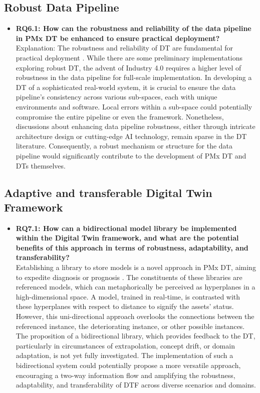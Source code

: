 \documentclass[runningheads]{llncs}
\begin{document}
\subsection{Robust Data Pipeline}

\begin{itemize}
    \item \textbf{RQ6.1: How can the robustness and reliability of the data pipeline in PMx DT be enhanced to ensure practical deployment?} \\
    Explanation: The robustness and reliability of DT are fundamental for practical deployment \cite{preuveneers2018robust}. While there are some preliminary implementations exploring robust DT, the advent of Industry 4.0 requires a higher level of robustness in the data pipeline for full-scale implementation. In developing a DT of a sophisticated real-world system, it is crucial to ensure the data pipeline's consistency across various sub-spaces, each with unique environments and software. Local errors within a sub-space could potentially compromise the entire pipeline or even the framework. Nonetheless, discussions about enhancing data pipeline robustness, either through intricate architecture design or cutting-edge AI technology, remain sparse in the DT literature. Consequently, a robust mechanism or structure for the data pipeline would significantly contribute to the development of PMx DT and DTs themselves.
\end{itemize}

\subsection{Adaptive and transferable Digital Twin Framework}
\begin{itemize}
    \item \textbf{RQ7.1: How can a bidirectional model library be implemented within the Digital Twin framework, and what are the potential benefits of this approach in terms of robustness, adaptability, and transferability?} \\
    Establishing a library to store models is a novel approach in PMx DT, aiming to expedite diagnosis or prognosis \cite{kapteyn2022data}. The constituents of these libraries are referenced models, which can metaphorically be perceived as hyperplanes in a high-dimensional space. A model, trained in real-time, is contrasted with these hyperplanes with respect to distance to signify the assets' status. However, this uni-directional approach overlooks the connections between the referenced instance, the deteriorating instance, or other possible instances. The proposition of a bidirectional library, which provides feedback to the DT, particularly in circumstances of extrapolation, concept drift, or domain adaptation, is not yet fully investigated. The implementation of such a bidirectional system could potentially propose a more versatile approach, encouraging a two-way information flow and amplifying the robustness, adaptability, and transferability of DTF across diverse scenarios and domains. 
\end{itemize}
\end{document}
